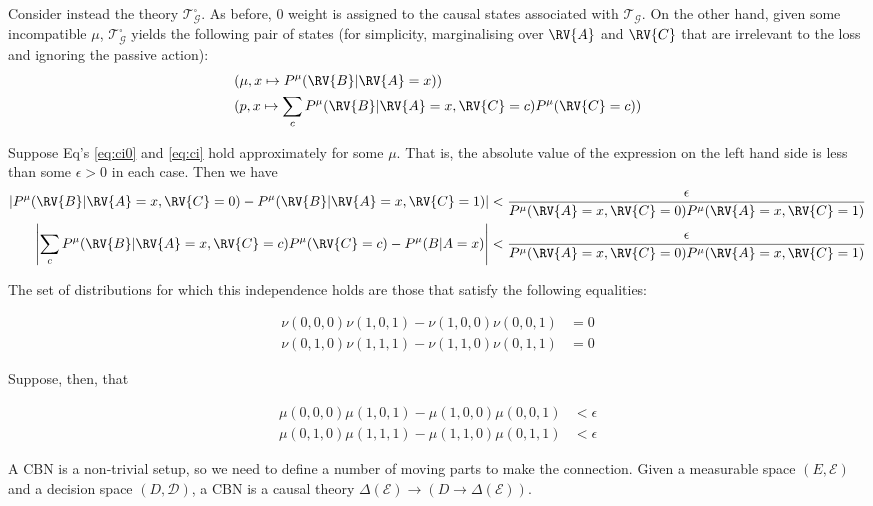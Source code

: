 Consider instead the theory $\mathscr{T}^\square_{\mathcal{G}}$. As before, 0 weight is assigned to the causal states associated with $\mathscr{T}_{\mathcal{G}}$. On the other hand, given some incompatible $\mu$, $\mathscr{T}^\square_{\mathcal{G}}$ yields the following pair of states (for simplicity, marginalising over $\RV{A}$ and $\RV{C}$ that are irrelevant to the loss and ignoring the passive action):
\begin{align}
    &(\mu,x\mapsto P^\mu(\RV{B}|\RV{A}=x) )\label{eq:cbn_s1}\\
    &(p,x \mapsto \sum_c P^\mu(\RV{B}|\RV{A}=x,\RV{C}=c)P^\mu(\RV{C}=c)) \label{eq:cbn_s2}
\end{align}

Suppose Eq's \ref{eq:ci0} and \ref{eq:ci} hold approximately for some $\mu$. That is, the absolute value of the expression on the left hand side is less than some $\epsilon>0$ in each case. Then we have
\begin{align}
    \left|P^\mu(\RV{B}|\RV{A}=x,\RV{C}=0) - P^\mu(\RV{B}|\RV{A}=x,\RV{C}=1) \right| &< \frac{\epsilon}{P^\mu(\RV{A}=x,\RV{C}=0) P^\mu(\RV{A}=x,\RV{C}=1)}\\
    \left|\sum_c P^\mu(\RV{B}|\RV{A}=x,\RV{C}=c)P^\mu(\RV{C}=c)-P^\mu(B|A=x)\right| &< \frac{\epsilon}{P^\mu(\RV{A}=x,\RV{C}=0) P^\mu(\RV{A}=x,\RV{C}=1)} 
\end{align}

The set of distributions for which this independence holds are those that satisfy the following equalities:

\begin{align}
    \nu(0,0,0)\nu(1,0,1)-\nu(1,0,0)\nu(0,0,1)&=0\label{eq:ci0}\\
    \nu(0,1,0)\nu(1,1,1)-\nu(1,1,0)\nu(0,1,1)&=0 \label{eq:ci}
\end{align}

Suppose, then, that 

\begin{align}
    \mu(0,0,0)\mu(1,0,1)-\mu(1,0,0)\mu(0,0,1)&<\epsilon\label{eq:eci0}\\
    \mu(0,1,0)\mu(1,1,1)-\mu(1,1,0)\mu(0,1,1)&<\epsilon \label{eq:eci1}
\end{align}



A CBN is a non-trivial setup, so we need to define a number of moving parts to make the connection. Given a measurable space $(E,\mathcal{E})$ and a decision space $(D,\mathcal{D})$, a CBN is a causal theory $\Delta(\mathcal{E})\to (D\to \Delta(\mathcal{E}))$.

